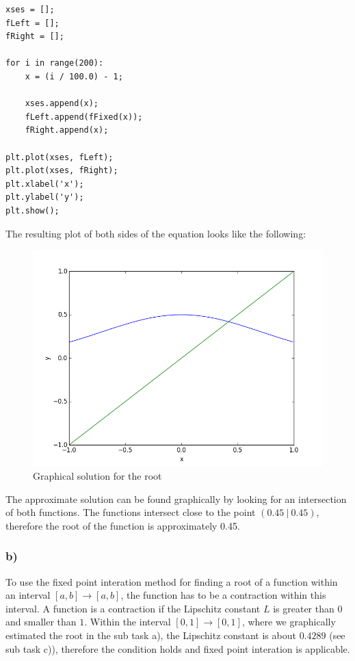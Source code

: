 \begin{lstlisting}[caption=Problem 4.8 a)]
xses = [];
fLeft = [];
fRight = [];

for i in range(200):
	x = (i / 100.0) - 1;
	
	xses.append(x);
	fLeft.append(fFixed(x));
	fRight.append(x);

plt.plot(xses, fLeft);
plt.plot(xses, fRight);
plt.xlabel('x');
plt.ylabel('y');
plt.show();
\end{lstlisting}

The resulting plot of both sides of the equation looks like the following:

\begin{figure}[!ht]
\includegraphics[width=1\textwidth]{chapters/images/figure-4-8-a}
\caption{Graphical solution for the root}
\end{figure}

The approximate solution can be found graphically by looking for an intersection of both functions. The functions intersect close to the point $(0.45~|~0.45)$, therefore the root of the function is approximately 0.45.


\subsubsection{b)}

To use the fixed point interation method for finding a root of a function within an interval $[a, b] \rightarrow [a, b]$, the function has to be a contraction within this interval. A function is a contraction if the Lipschitz constant $L$ is greater than $0$ and smaller than $1$. Within the interval $[0, 1] \rightarrow [0, 1]$, where we graphically estimated the root in the sub task a), the Lipschitz constant is about $0.4289$ (see sub task c)), therefore the condition holds and fixed point interation is applicable.

